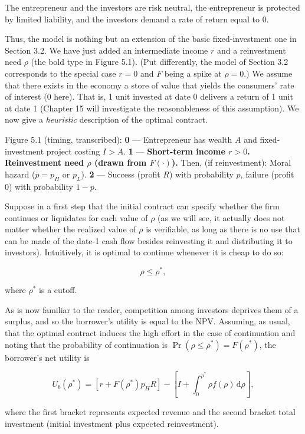 \documentclass[11pt,a4paper]{article}
\begin{document}
The entrepreneur and the investors are risk neutral, the entrepreneur is protected by limited
liability, and the investors demand a rate of return equal to 0.

Thus, the model is nothing but an extension of the basic fixed-investment one in Section 3.2. We
have just added an intermediate income \(r\) and a reinvestment need \(\rho\) (the bold type in
Figure 5.1). (Put differently, the model of Section 3.2 corresponds to the special case \(r = 0\)
and \(F\) being a spike at \(\rho = 0\).) We assume that there exists in the economy a store of
value that yields the consumers' rate of interest (0 here). That is, 1 unit invested at date 0
delivers a return of 1 unit at date 1 (Chapter 15 will investigate the reasonableness of this
assumption). We now give a \emph{heuristic} description of the optimal contract.

Figure 5.1 (timing, transcribed): \textbf{0} --- Entrepreneur has wealth \(A\) and fixed-investment
project costing \(I > A\). \textbf{1} --- \textbf{Short-term income \(r > 0\). Reinvestment need
\(\rho\) (drawn from \(F(\cdot)\)).} Then, (if reinvestment): Moral hazard (\(p = p_H\) or \(p_L\)).
\textbf{2} --- Success (profit \(R\)) with probability \(p\), failure (profit 0) with probability
\(1 - p\).

Suppose in a first step that the initial contract can specify whether the firm continues or
liquidates for each value of \(\rho\) (as we will see, it actually does not matter whether the
realized value of \(\rho\) is verifiable, as long as there is no use that can be made of the date-1
cash flow besides reinvesting it and distributing it to investors). Intuitively, it is optimal to
continue whenever it is cheap to do so:

\[\rho \leqslant \rho^*,\]

where \(\rho^*\) is a cutoff.

As is now familiar to the reader, competition among investors deprives them of a surplus, and so the
borrower's utility is equal to the NPV. Assuming, as usual, that the optimal contract induces the
high effort in the case of continuation and noting that the probability of continuation is
\(\Pr(\rho \leqslant \rho^*) = F(\rho^*)\), the borrower's net utility is

\[U_b(\rho^*) = [r + F(\rho^*)p_HR] - \left[I + \int_0^{\rho^*}\rho f(\rho)\,\mathrm{d}\rho\right],\]

where the first bracket represents expected revenue and the second bracket total investment (initial
investment plus expected reinvestment).
\end{document}
